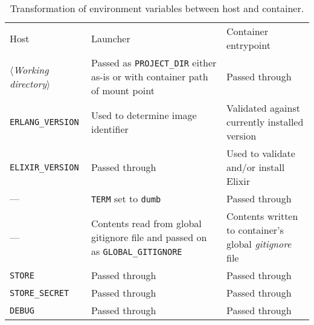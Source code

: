 \begin{table}[h]
  \setlength{\tabcolsep}{10pt}
  \centering
  \begin{tabularx}{\textwidth}{l X X}
    Host & Launcher & Container entrypoint \\
    \hhline{===}
    $\langle$\emph{Working directory}$\rangle$ &
      Passed as \lstinline|PROJECT_DIR| \newline
      either as-is or with container path of mount point &
      Passed through \\
    \hline
    \lstinline|ERLANG_VERSION| &
      Used to determine \newline
      image identifier &
      Validated against \newline
      currently installed version \\
    \hline
    \lstinline|ELIXIR_VERSION| &
      Passed through &
      Used to validate and/or \newline
      install Elixir \\
    \hline
    --- &
      \lstinline|TERM| set to \lstinline|dumb| &
      Passed through \\
    \hline
    --- &
      Contents read from global gitignore
      file and passed on as \lstinline|GLOBAL_GITIGNORE| &
      Contents written to \newline
      container's global \newline
      \emph{gitignore} file \\
    \hline
    \lstinline|STORE| & Passed through & Passed through \\
    \hline
    \lstinline|STORE_SECRET| & Passed through & Passed through \\
    \hline
    \lstinline|DEBUG| & Passed through & Passed through \\
    \hline
  \end{tabularx}
  \caption{Transformation of environment variables between host and container.}\label{table:envvars}
\end{table}
